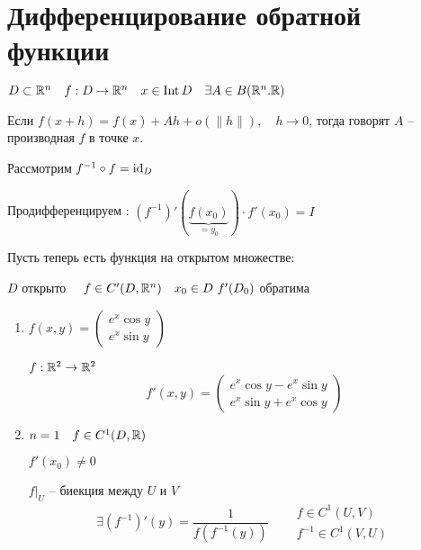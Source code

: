    \section*{Дифференцирование обратной функции}

    $D \subset \mathbb{R}^n \quad f : D \rightarrow \mathbb{R}^n \quad x \in \operatorname{Int} D \quad \exists A \in B(\mathbb{R}^n. \mathbb{R})$
    
    \begin{definition}
        Если $f(x + h) = f(x) + Ah + o(\|h\|), \quad h \rightarrow 0$, тогда говорят $A$ -- производная $f$ в точке $x$.
    \end{definition}

    \begin{figure}[ht]
        \centering
        \label{fig:figurka}
    \end{figure}


    Рассмотрим $f^{-1} \circ f = \operatorname*{id}_D$

    Продифференцируем : $(f^{-1})'(\underbrace{f(x_0)}_{= y_0}) \cdot f'(x_0) = I$

    Пусть теперь есть функция на открытом множестве:

    $D$ открыто $\quad f \in C'(D, \mathbb{R}^n) \quad x _0 \in D \ f'(D_0)$ обратима

    \begin{illustration}\leavevmode
        \begin{enumerate}
            \item $f(x, y) = \begin{pmatrix}e^x \cos y \\ e^x \sin y \end{pmatrix}$
            \par $f : \mathbb{R}^2 \rightarrow \mathbb{R}^2$
            \[
                f'(x, y) = \begin{pmatrix} e^x\cos y - e^x\sin y \\ e^x\sin y + e^x\cos y \end{pmatrix}    
            \]
            \item $n = 1 \quad f \in C^1(D, \mathbb{R})$
            \par $f'(x_0) \not= 0$
            \par $f\big|_U$ -- биекция между $U$ и $V$
            \[
                \exists (f^{-1})'(y) = \frac{1}{f(f^{-1}(y))} \quad \begin{aligned} &f \in C^1(U, V) \\ &f^{-1} \in C^1(V, U) \end{aligned}    
            \]
        \end{enumerate}
    \end{illustration}

